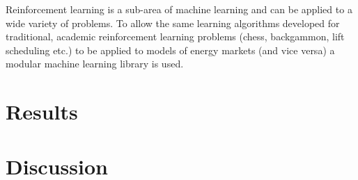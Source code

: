 Reinforcement learning is a sub-area of machine learning and can be applied to
a wide variety of problems\cite{suttonbarto:reinforcement}.  To allow the same
learning algorithms developed for traditional, academic reinforcement learning
problems (chess, backgammon, lift scheduling etc.) to be applied to models of
energy markets (and vice versa) a modular machine learning library is used.

\chapter{Results}

\chapter{Discussion}
